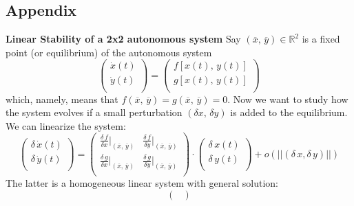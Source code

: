\subsection*{Appendix}
\textbf{Linear Stability of a 2x2 autonomous system}
\label{app:bifurcation_diagram}
{\small
Say $(\overline{x},\, \overline{y})\in \mathbb{R}^2$ is a fixed point (or equilibrium) of the autonomous system 
\begin{equation*}
    \begin{pmatrix}
        \dot{x}(t) \\
        \dot{y}(t) \\
    \end{pmatrix}
    = 
        \begin{pmatrix}
        f[x(t),\, y(t)] \\
        g[x(t),\, y(t)] \\
    \end{pmatrix}
\end{equation*}
which, namely, means that $f(\overline{x},\, \overline{y}) = g(\overline{x},\, \overline{y}) = 0$. Now we want to study how the system evolves if a small perturbation $(\delta x,\, \delta y)$ is added to the equilibrium. We can linearize the system:
\begin{equation*}
    \begin{pmatrix}
        \delta\,\dot{x}(t) \\
        \delta\,\dot{y}(t) \\
    \end{pmatrix}
    = 
        \begin{pmatrix}
        \frac{\delta\,f}{\delta x}|_{(\overline{x},\,\overline{y})} & \frac{\delta\,f}{\delta y}|_{(\overline{x},\,\overline{y})}\\
        \frac{\delta\,g}{\delta x}|_{(\overline{x},\,\overline{y})} & \frac{\delta\,g}{\delta y}|_{(\overline{x},\,\overline{y})} \\
    \end{pmatrix}
    \cdot
        \begin{pmatrix}
        \delta\,x(t) \\
        \delta\,y(t) \\
    \end{pmatrix}
    +
    o(||(\delta\,x, \delta\,y)||)
\end{equation*}
 The latter is a homogeneous linear system with general solution:
\begin{equation*}
        \begin{pmatrix}

\end{pmatrix}
\end{equation*}}
